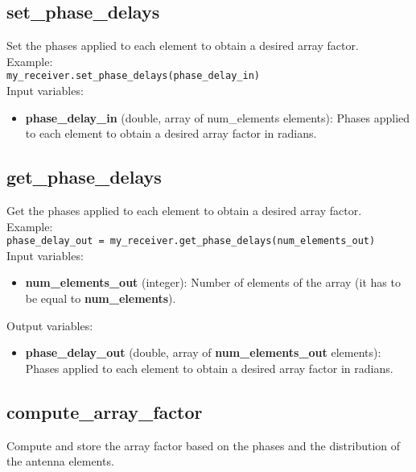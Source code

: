 \subsection{set\_phase\_delays}

Set the phases applied to each element to obtain a desired array factor.\\

Example:\\

\texttt{my\_receiver.set\_phase\_delays(phase\_delay\_in)}\\

Input variables:
\begin{itemize}
\item {\bf phase\_delay\_in} (double, array of num\_elements elements): Phases applied to each element to obtain a desired array factor in radians.
\end{itemize}


\subsection{get\_phase\_delays}

Get the phases applied to each element to obtain a desired array factor.\\

Example:\\

\texttt{phase\_delay\_out = my\_receiver.get\_phase\_delays(num\_elements\_out)}\\

Input variables:
\begin{itemize}
\item {\bf num\_elements\_out} (integer): Number of elements of the array (it has to be equal to {\bf num\_elements}).
\end{itemize}

Output variables:
\begin{itemize}
\item {\bf phase\_delay\_out} (double, array of {\bf num\_elements\_out} elements): Phases applied to each element to obtain a desired array factor in radians.
\end{itemize}


\subsection{compute\_array\_factor}

Compute and store the array factor based on the phases and the distribution of the antenna elements.\\

